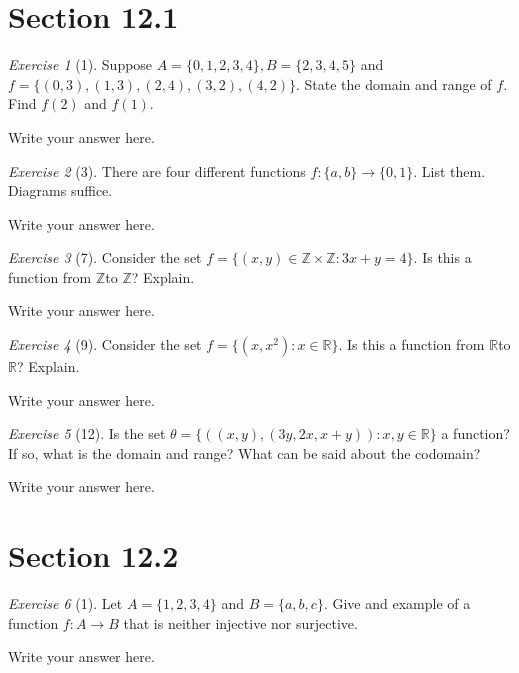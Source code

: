 \documentclass[12pt]{amsart}
\makeatletter
\theoremstyle{remark}
\newtheorem*{exercise}{Exercise}%
\def\RR{\ensuremath{\mathbb R}}
\def\ZZ{\ensuremath{\mathbb Z}}
\renewenvironment{proof}[1][\proofname]{\par\doublespacing
  \pushQED{\qed}%
  \normalfont \topsep6\p@\@plus6\p@\relax
  \list{}{%
    \settowidth{\leftmargin}{\itshape\proofname:\hskip\labelsep}%
    \setlength{\labelwidth}{0pt}%
    \setlength{\itemindent}{-\leftmargin}%
  }%
  \item[\hskip\labelsep\itshape#1\@addpunct{:}]\ignorespaces
}{%
  \popQED\endlist\@endpefalse
  \singlespacing
}
\theoremstyle{mycomment}
\makeatother
\begin{document}
\thispagestyle{fancy}
\section*{Section 12.1} 

\begin{exercise}[1] Suppose $A=\{0,1,2,3,4\}, B=\{2,3,4,5\}$ and $f=\{(0,3),(1,3),(2,4),(3,2),(4,2)\}$. State the domain and range of $f$. Find $f(2)$ and $f(1)$.
\begin{proof}[Solution]
Write your answer here.
\end{proof}
\end{exercise}

\begin{exercise}[3] There are four different functions $f:\{a,b\}\to\{0,1\}$. List them. Diagrams suffice.
\begin{proof}[Solution]
Write your answer here.
\end{proof}
\end{exercise}

\begin{exercise}[7] Consider the set $f=\{(x,y)\in \ZZ\times\ZZ:3x+y=4\}$. Is this a function from \ZZ to \ZZ? Explain.
\begin{proof}[Solution]
Write your answer here.
\end{proof}
\end{exercise}

\begin{exercise}[9] Consider the set $f=\{(x,x^{2}):x\in \RR\}$. Is this a function from \RR to \RR? Explain.
\begin{proof}[Solution]
Write your answer here.
\end{proof}
\end{exercise}

\begin{exercise}[12] Is the set $\theta=\{\left((x,y),(3y,2x,x+y)\right):x,y\in\RR\}$ a function? If so, what is the domain and range? What can be said about the codomain?
\begin{proof}[Solution]
Write your answer here.
\end{proof}
\end{exercise}

\section*{Section 12.2}
\begin{exercise}[1] Let $A=\{1,2,3,4\}$ and $B=\{a,b,c\}$. Give and example of a function $f:A\to B$ that is neither injective nor surjective.
\begin{proof}[Solution]
Write your answer here.
\end{proof}
\end{exercise}
\end{document}
